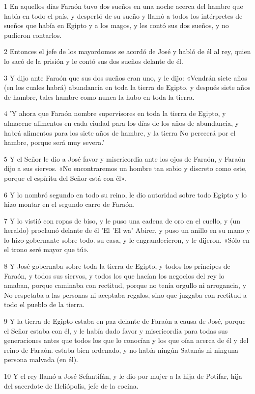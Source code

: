 \par 1 En aquellos días Faraón tuvo dos sueños en una noche acerca del hambre que había en todo el país, y despertó de su sueño y llamó a todos los intérpretes de sueños que había en Egipto y a los magos, y les contó sus dos sueños, y no pudieron contarlos.
\par 2 Entonces el jefe de los mayordomos se acordó de José y habló de él al rey, quien lo sacó de la prisión y le contó sus dos sueños delante de él.
\par 3 Y dijo ante Faraón que sus dos sueños eran uno, y le dijo: «Vendrán siete años (en los cuales habrá) abundancia en toda la tierra de Egipto, y después siete años de hambre, tales hambre como nunca la hubo en toda la tierra.
\par 4 'Y ahora que Faraón nombre supervisores en toda la tierra de Egipto, y almacene alimentos en cada ciudad para los días de los años de abundancia, y habrá alimentos para los siete años de hambre, y la tierra No perecerá por el hambre, porque será muy severa.'
\par 5 Y el Señor le dio a José favor y misericordia ante los ojos de Faraón, y Faraón dijo a sus siervos. «No encontraremos un hombre tan sabio y discreto como este, porque el espíritu del Señor está con él».
\par 6 Y lo nombró segundo en todo su reino, le dio autoridad sobre todo Egipto y lo hizo montar en el segundo carro de Faraón.
\par 7 Y lo vistió con ropas de biso, y le puso una cadena de oro en el cuello, y (un heraldo) proclamó delante de él 'El 'El wa' Abirer, y puso un anillo en su mano y lo hizo gobernante sobre todo. su casa, y le engrandecieron, y le dijeron. «Sólo en el trono seré mayor que tú».
\par 8 Y José gobernaba sobre toda la tierra de Egipto, y todos los príncipes de Faraón, y todos sus siervos, y todos los que hacían los negocios del rey lo amaban, porque caminaba con rectitud, porque no tenía orgullo ni arrogancia, y No respetaba a las personas ni aceptaba regalos, sino que juzgaba con rectitud a todo el pueblo de la tierra.
\par 9 Y la tierra de Egipto estaba en paz delante de Faraón a causa de José, porque el Señor estaba con él, y le había dado favor y misericordia para todas sus generaciones antes que todos los que lo conocían y los que oían acerca de él y del reino de Faraón. estaba bien ordenado, y no había ningún Satanás ni ninguna persona malvada (en él).
\par 10 Y el rey llamó a José Sefantifán, y le dio por mujer a la hija de Potifar, hija del sacerdote de Heliópolis, jefe de la cocina.
